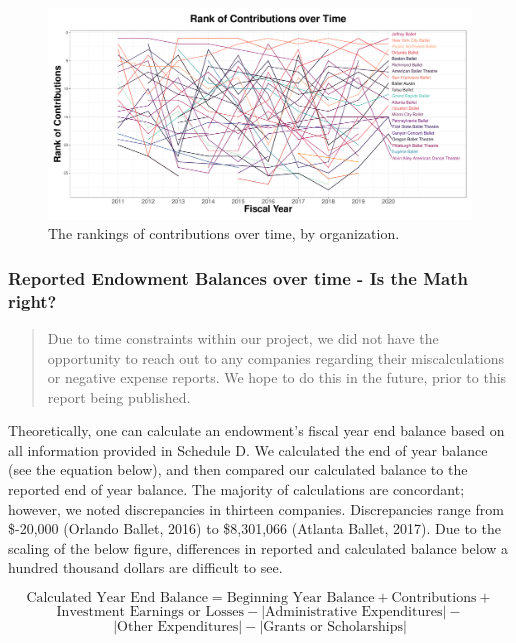 \documentclass[Dance Data
Project,article,submit,moreauthors,pdftex]{mdpi}
\begin{document}
\begin{figure}[H]
\includegraphics[width=0.9\linewidth,]{../images/ranking-contributions} \caption{\label{fig:rankings-contributions}The rankings of contributions over time, by organization.}\label{fig:ranking-contributions}
\end{figure}

\hypertarget{reported-endowment-balances-over-time---is-the-math-right}{%
\subsubsection{Reported Endowment Balances over time - Is the Math
right?}\label{reported-endowment-balances-over-time---is-the-math-right}}

\begin{quote}
Due to time constraints within our project, we did not have the
opportunity to reach out to any companies regarding their
miscalculations or negative expense reports. We hope to do this in the
future, prior to this report being published.
\end{quote}

Theoretically, one can calculate an endowment's fiscal year end balance
based on all information provided in Schedule D. We calculated the end
of year balance (see the equation below), and then compared our
calculated balance to the reported end of year balance. The majority of
calculations are concordant; however, we noted discrepancies in thirteen
companies. Discrepancies range from \$-20,000 (Orlando Ballet, 2016) to
\$8,301,066 (Atlanta Ballet, 2017). Due to the scaling of the below
figure, differences in reported and calculated balance below a hundred
thousand dollars are difficult to see.

\[\text{Calculated Year End Balance} = \text{Beginning Year Balance} + \text{Contributions} +\]
\[ \text{Investment Earnings or Losses} - |\text{Administrative Expenditures}| -\]
\[|\text{Other Expenditures}| - | \text{Grants or Scholarships}| \tag{1}\]
\end{document}
